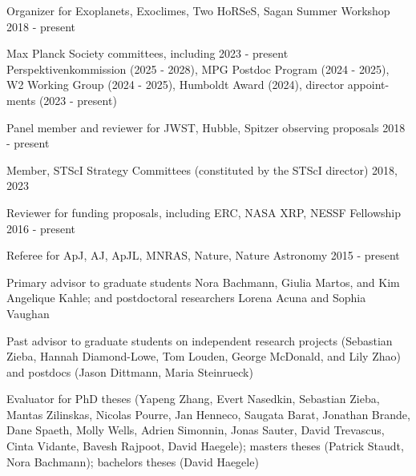 \documentclass[12pt,letterpaper]{article}
\begin{document}
\begin{list}{}{\cvlist}
    \item Organizer for Exoplanets, Exoclimes, Two HoRSeS, Sagan Summer Workshop \hfill 2018 - present
    \item Max Planck Society committees, including \hfill 2023 - present\\
        \hspace*{0.5em}Perspektivenkommission (2025 - 2028), MPG Postdoc Program (2024 - 2025),\\
        \hspace*{0.5em}W2 Working Group (2024 - 2025), Humboldt Award (2024), director appoint-\\
        \hspace*{0.5em}ments (2023 - present)
    \item Panel member and reviewer for JWST, Hubble, Spitzer observing proposals \hfill 2018 - present
    \item Member, STScI Strategy Committees (constituted by the STScI director) \hfill 2018, 2023 
    \item Reviewer for funding proposals, including ERC, NASA XRP, NESSF Fellowship \hfill 2016 - present
    \item Referee for ApJ, AJ, ApJL, MNRAS, Nature, Nature Astronomy \hfill 2015 - present
\end{list}

\begin{list}{}{\cvlist}
\item Primary advisor to graduate students Nora Bachmann, Giulia Martos, and Kim Angelique Kahle; and postdoctoral researchers Lorena Acuna and Sophia Vaughan 
\item Past advisor to graduate students on independent research projects (Sebastian Zieba, Hannah Diamond-Lowe, Tom Louden, George McDonald, and Lily Zhao) and postdocs (Jason Dittmann, Maria Steinrueck)
\item Evaluator for PhD theses (Yapeng Zhang, Evert Nasedkin, Sebastian Zieba, Mantas Zilinskas, Nicolas Pourre, Jan Henneco, Saugata Barat, Jonathan Brande, Dane Spaeth, Molly Wells, Adrien Simonnin, Jonas Sauter, David Trevascus, Cinta Vidante, Bavesh Rajpoot, David Haegele); masters theses (Patrick Staudt, Nora Bachmann); bachelors theses (David Haegele)

\end{list}
\end{document}
